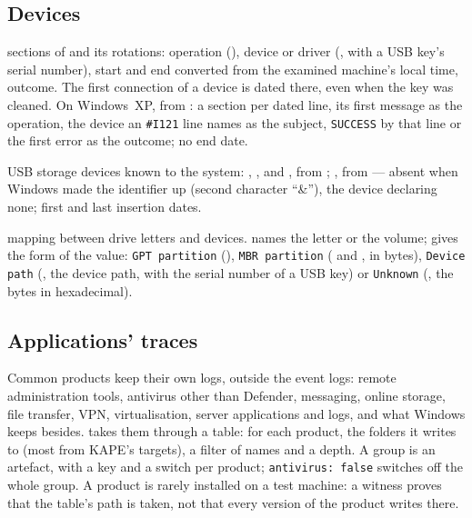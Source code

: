 \documentclass[11pt,a4paper,oneside]{report}
\begin{document}
\subsection{Devices}

\begin{description}[style=nextline,leftmargin=1.2em]
  \item[\fichier{setupapi.json}] sections of  and its
        rotations: operation (), device or driver
        (, with a USB key's serial number), start and end
        converted from the examined machine's local time, outcome. The first
        connection of a device is dated there, even when the 
        key was cleaned. On Windows~XP, from : a section
        per dated line, its first message as the operation, the device an
        \texttt{\#I121} line names as the subject, \texttt{SUCCESS} by that
        line or the first error as the outcome; no end date.
  \item[\fichier{Usbstor.json}] USB storage devices known to the system:
        , ,  and ,
        from ; , from 
        — absent when Windows made the identifier up (second character
        ``\&''), the device declaring none; first and last insertion dates.
  \item[\fichier{mounted\_device.json}] mapping between drive letters and
        devices.  names the letter or the volume; 
        gives the form of the value: \texttt{GPT partition}
        (), \texttt{MBR partition}
        ( and , in bytes),
        \texttt{Device path} (, the device path, with the serial
        number of a USB key) or \texttt{Unknown} (, the bytes in
        hexadecimal).
\end{description}

\subsection{Applications' traces}\label{sec:traces}

Common products keep their own logs, outside the event logs: remote
administration tools, antivirus other than Defender, messaging, online
storage, file transfer, VPN, virtualisation, server applications and logs, and
what Windows keeps besides. \wac{} takes them through a table: for each
product, the folders it writes to (most from KAPE's targets), a filter of
names and a depth. A group is an artefact, with a  key and a
switch per product; \texttt{antivirus: false} switches off the whole group. A
product is rarely installed on a test machine: a witness proves that the
table's path is taken, not that every version of the product writes there.
\end{document}
